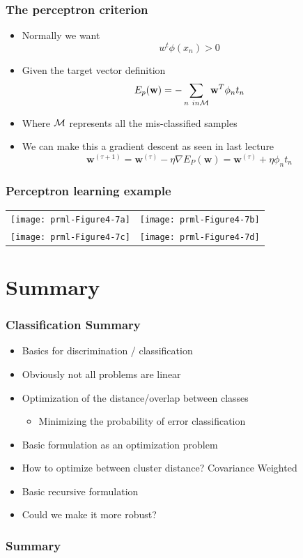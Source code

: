 \documentclass[10pt]{beamer}
\begin{document}
\begin{frame}
  \frametitle{The perceptron criterion}
  \begin{itemize}
  \item Normally we want\@
    \[
    w^t \phi(x_n) > 0
    \]
  \item Given the target vector definition
    \[
    E_p({\mathbf w}) = - \sum_{n \ in {\cal M}} {\mathbf w}^T \phi_n t_n
    \]
  \item Where ${\cal M}$ represents all the mis-classified samples
  \item We can make this a gradient descent as seen in last lecture
    \[
    {\mathbf w}^{(\tau+1)} = {\mathbf w}^{(\tau)} - \eta \nabla E_P({\mathbf w})
                         = {\mathbf w}^{(\tau)} + \eta \phi_n t_n
    \]
  \end{itemize}
\end{frame}

\begin{frame}
  \frametitle{Perceptron learning example}
  \begin{center}
    \begin{tabular}[c]{cc}
      \texttt{[image: prml-Figure4-7a]} &
      \texttt{[image: prml-Figure4-7b]} \\
      \texttt{[image: prml-Figure4-7c]} & 
      \texttt{[image: prml-Figure4-7d]} \\
    \end{tabular}
  \end{center}
\end{frame}

\section{Summary}

\begin{frame}
  \frametitle{Classification Summary}
  \begin{itemize}
  \item Basics for discrimination / classification
  \item Obviously not all problems are linear
  \item Optimization of the distance/overlap between classes
    \begin{itemize}
    \item Minimizing the probability of error classification 
    \end{itemize}
  \item Basic formulation as an optimization problem
  \item How to optimize between cluster distance? Covariance Weighted
  \item Basic recursive formulation
  \item Could we make it more robust? 
  \end{itemize}
\end{frame}

\begin{frame}
  \frametitle{Summary}
\end{frame}

\newcommand{\newblock}{}
{\tiny
% 
  
}
\end{document}
